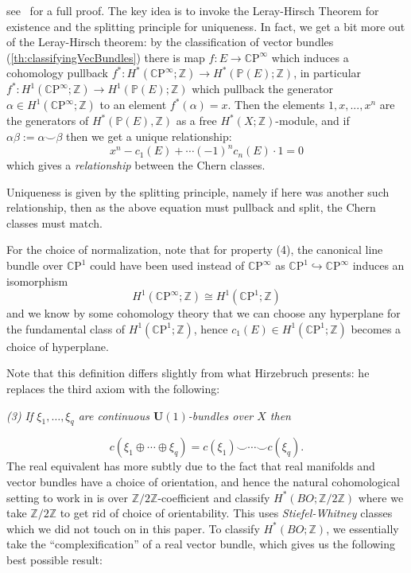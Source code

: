 \documentclass{book}
\newcommand{\Z}{{\mathbb{Z}}}
\renewcommand{\P}{{\mathbb{P}}}
\newcommand{\CP}{\mathbb{C}\mathrm{P}}
\begin{document}
\begin{Proof}
  see~\cite{NateKTheory} for a full proof. The key idea is to invoke the Leray-Hirsch Theorem for existence
  and the splitting principle for uniqueness. In fact, we get a bit more out of the Leray-Hirsch theorem: by the classification of
  vector bundles (\cref{th:classifyingVecBundles}) there is map $f:E \to \CP^\infty$ which induces a
  cohomology pullback $f^*: H^*(\CP^\infty;\Z) \to H^*\left(\P(E);\Z\right)$, in particular $f^*:
  H^1(\CP^\infty;\Z) \to H^1(\P(E); \Z)$ which pullback the generator $\alpha \in H^1(\CP^\infty;\Z)$ to an
  element $f^*(\alpha) = x$. Then the elements $1, x, ..., x^n$ are the generators of $H^*(\P(E), \Z)$ as a
  free $H^*(X; \Z)$-module, and if $\alpha\beta :=\alpha\smile \beta$ then we get a unique relationship:
  \[
    x^n - c_1(E) + \cdots (-1)^n c_n(E)\cdot 1 = 0
  \]
  which gives a \emph{relationship} between the Chern classes.

  Uniqueness is given by the splitting principle, namely if here was another such relationship, then as the
  above equation must pullback and split, the Chern classes must match.
\end{Proof}

For the choice of normalization, note that for property (4), the canonical line bundle over $\CP^1$ could have
been used instead of $\CP^\infty$ as $\CP^1 \hookrightarrow \CP^\infty$ induces an isomorphism
\[
	H^1(\CP^\infty; \Z) \cong H^1(\CP^1;\Z)
\]
and we know by some cohomology theory that we can choose any hyperplane for the fundamental class of
$H^1(\CP^1;\Z)$, hence $c_1(E) \in H^1(\CP^1;\Z)$ becomes a choice of hyperplane.

Note that this definition differs slightly from what Hirzebruch presents: he replaces the third axiom with the
following:
\begin{center}
  \emph{(3) If $\xi_1, \ldots, \xi_q$ are continuous $\mathbf{U}(1)$-bundles over $X$ then}
\end{center}
\[
    c(\xi_1 \oplus \cdots \oplus \xi_q) = c(\xi_1) \smile \cdots \smile c(\xi_q).
\]
The real equivalent has more subtly due to the fact that real manifolds and vector bundles have a choice of
orientation, and hence the natural cohomological setting to work in is over $\Z/2\Z$-coefficient and classify
$H^*(BO; \Z/2\Z)$ where we take $\Z/2\Z$ to get rid of choice of orientability. This uses
\emph{Stiefel-Whitney} classes which we did not touch on in this paper. To classify $H^*(BO; \Z)$, we
essentially take the ``complexification'' of a real vector bundle, which gives us the following best possible
result:
\end{document}
